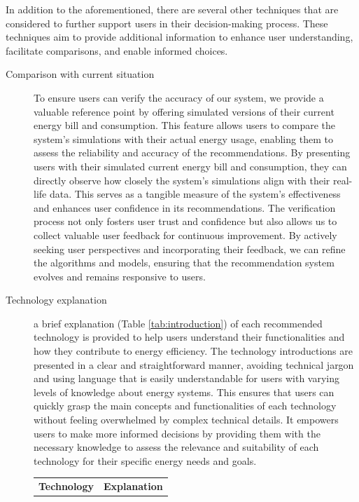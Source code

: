 In addition to the aforementioned, there are several other techniques that are considered to further support users in their decision-making process. 
These techniques aim to provide additional information to enhance user understanding, facilitate comparisons, and enable informed choices. 
\begin{description}
  \item[Comparison with current situation] To ensure users can verify the accuracy of our system, we provide a valuable reference point by offering simulated versions of their current energy bill and consumption. 
    This feature allows users to compare the system's simulations with their actual energy usage, enabling them to assess the reliability and accuracy of the recommendations. 
    By presenting users with their simulated current energy bill and consumption, they can directly observe how closely the system's simulations align with their real-life data. 
    This serves as a tangible measure of the system's effectiveness and enhances user confidence in its recommendations. 
    The verification process not only fosters user trust and confidence but also allows us to collect valuable user feedback for continuous improvement.
    By actively seeking user perspectives and incorporating their feedback, we can refine the algorithms and models, ensuring that the recommendation system evolves and remains responsive to users. 
  \item[Technology explanation] a brief explanation (Table \ref{tab:introduction}) of each recommended technology is provided to help users understand their functionalities and how they contribute to energy efficiency. 
    The technology introductions are presented in a clear and straightforward manner, avoiding technical jargon and using language that is easily understandable for users with varying levels of knowledge about energy systems. This ensures that users can quickly grasp the main concepts and functionalities of each technology without feeling overwhelmed by complex technical details.
    It empowers users to make more informed decisions by providing them with the necessary knowledge to assess the relevance and suitability of each technology for their specific energy needs and goals.
    \begin{center}
      \begin{table}[h!]
      \small
          \begin{tabular}{ | p{} | p{} | }
            \hline  
            \textbf{Technology} & \textbf{Explanation} \\

\end{tabular}
\end{table}
\end{center}
\end{description}
